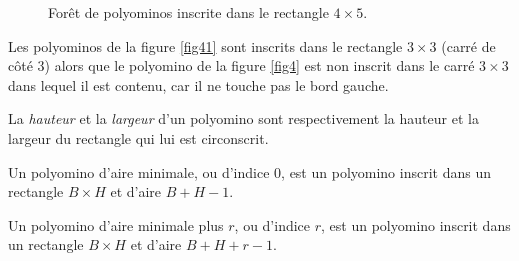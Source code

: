 \begin{figure}[!htb]
\begin{minipage}[c]{.05\linewidth}
 \centering
 
 \end{minipage}
 \hfill
 \begin{minipage}[c]{.66\linewidth}
 \centering
\begin{logicpuzzle}[rows=5,columns=4,color=cyan!100, width=750px,scale=0.5]
\framepuzzle[black!50]
\end{logicpuzzle}
\end{minipage}
\caption{\label{Supfig4} Forêt de polyominos inscrite dans le rectangle $4\times 5$.}
\end{figure}
\begin{Ex}\label{ex2}
Les polyominos de la figure \ref{fig41}  sont inscrits dans le rectangle $3 \times 3$ (carré de côté $3$) alors que le polyomino de la figure \ref{fig4} est non inscrit dans le carré $3\times 3$ dans lequel il est contenu, car il ne touche pas le bord  gauche.
\end{Ex}


 La \emph{hauteur} et la \emph{largeur} d'un polyomino sont respectivement la hauteur et la largeur du rectangle qui lui est circonscrit.


 Un polyomino d'aire minimale, ou d'indice $0$, est un polyomino inscrit
dans un rectangle $B\times H$ et d'aire $B + H - 1$.

Un polyomino d'aire minimale plus $r$, ou d'indice $r$, est un polyomino inscrit
dans un rectangle $B\times H$ et d'aire $B + H+r - 1$.
 
